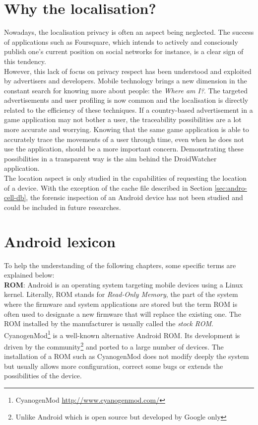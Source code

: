 \section*{Why the localisation?}
\label{sec:why-localisation}

Nowadays, the localisation privacy is often an aspect being neglected.
The success of applications such as Foursquare, which intends to actively and consciously publish one's current position on social networks for instance, is a clear sign of this tendency.\\

However, this lack of focus on privacy respect has been understood and exploited by advertisers and developers.
Mobile technology brings a new dimension in the constant search for knowing more about people: the \emph{Where am I?}.
The targeted advertisements and user profiling is now common and the localisation is directly related to the efficiency of these techniques.
If a country-based advertisement in a game application may not bother a user, the traceability possibilities are a lot more accurate and worrying.
Knowing that the same game application is able to accurately trace the movements of a user through time, even when he does not use the application, should be a more important concern.
Demonstrating these possibilities in a transparent way is the aim behind the DroidWatcher application.\\

The location aspect is only studied in the capabilities of requesting the location of a device.
With the exception of the cache file described in Section \ref{sec:andro-cell-db}, the forensic inspection of an Android device has not been studied and could be included in future researches.

\section*{Android lexicon}
\label{sec:android-lexicon}

To help the understanding of the following chapters, some specific terms are explained below:\\

\textbf{ROM}: Android is an operating system targeting mobile devices using a Linux kernel.
Literally, ROM stands for \emph{Read-Only Memory}, the part of the system where the firmware and system applications are stored but the term ROM is often used to designate a new firmware that will replace the existing one.
The ROM installed by the manufacturer is usually called the \emph{stock ROM}.
CyanogenMod\footnote{CyanogenMod \url{http://www.cyanogenmod.com/}} is a well-known alternative Android ROM.
Its development is driven by the community\footnote{Unlike Android which is open source but developed by Google only} and ported to a large number of devices.
The installation of a ROM such as CyanogenMod does not modify deeply the system but usually allows more configuration, correct some bugs or extends the possibilities of the device.\\

